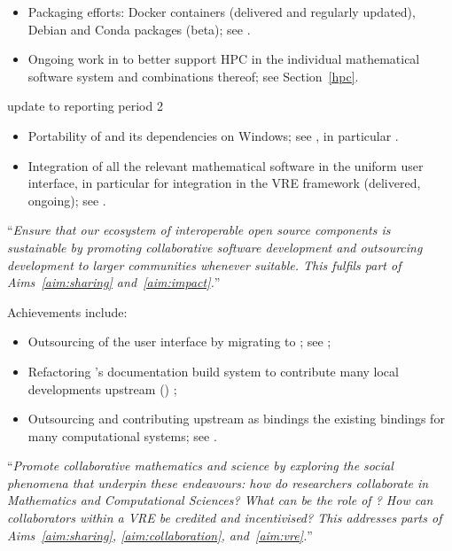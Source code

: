 \begin{compactenum}[\bf O1\rm:]
\begin{itemize}
  \item Packaging efforts: Docker containers (delivered and regularly updated), Debian and
    Conda packages (beta); see .
  \item Ongoing work in  to better support HPC in the individual mathematical
    software system and combinations thereof; see Section~\ref{hpc}.
  \end{itemize}

  \begin{oldpart}{update to reporting period 2}
  \begin{itemize}
  \item Portability of \Sage and its dependencies on Windows; see
    , in particular
    .
  \item Integration of all the relevant mathematical software in the uniform \Jupyter user
    interface, in particular for integration in the VRE framework (delivered, ongoing);
    see .
  \end{itemize}
\end{oldpart}

\item \label{objective:sustainable} ``\emph{Ensure that our ecosystem of
  interoperable open source components is \emph{sustainable} by
  promoting collaborative software development and outsourcing
  development to larger communities whenever suitable. This fulfils
  part of Aims~\ref{aim:sharing} and~\ref{aim:impact}.}''

Achievements include:
\begin{itemize}
\item Outsourcing of the \Sage user interface by migrating to \Jupyter; see
  ;
\item Refactoring \Sage's documentation build system to contribute many local developments
  upstream (\Sphinx) ;
\item Outsourcing and contributing upstream as \Python bindings the existing \Sage
  bindings for many computational systems; see .
\end{itemize}

\item \label{objective:social} ``\emph{Promote collaborative mathematics and
  science by exploring the social phenomena that underpin these
  endeavours: how do researchers collaborate in Mathematics and
  Computational Sciences?  What can be the role of \VREs?  How can
  collaborators within a VRE be credited and incentivised? This
  addresses parts of Aims~\ref{aim:sharing}, \ref{aim:collaboration},
  and~\ref{aim:vre}.}''


\end{compactenum}
